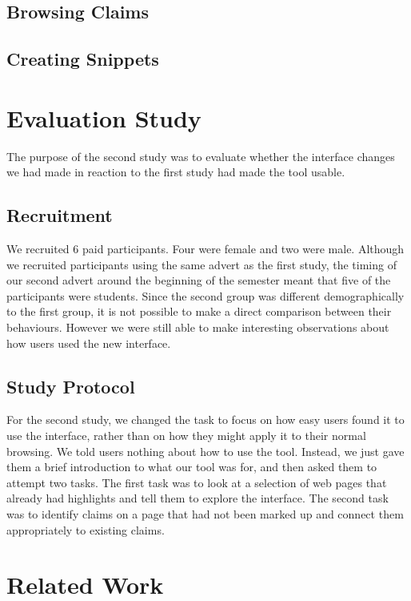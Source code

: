 \documentclass{chi2009}
\begin{document}
\subsection{Browsing Claims}

\subsection{Creating Snippets}


\section{Evaluation Study}

The purpose of the second study was to evaluate whether the interface changes we had made in reaction to the first study had made the tool usable. 

\subsection{Recruitment}

We recruited 6 paid participants. Four were female and two were male. Although we recruited participants using the same advert as the first study, the timing of our second advert around the beginning of the semester meant that five of the participants were students. Since the second group was different demographically to the first group, it is not possible to make a direct comparison between their behaviours. However we were still able to make interesting observations about how users used the new interface.

\subsection{Study Protocol}

For the second study, we changed the task to focus on how easy users found it to use the interface, rather than on how they might apply it to their normal browsing. We told users nothing about how to use the tool. Instead, we just gave them a brief introduction to what our tool was for, and then asked them to attempt two tasks. The first task was to look at a selection of web pages that already had highlights and tell them to explore the interface. The second task was to identify claims on a page that had not been marked up and connect them appropriately to existing claims.



\section{Related Work}
\end{document}
